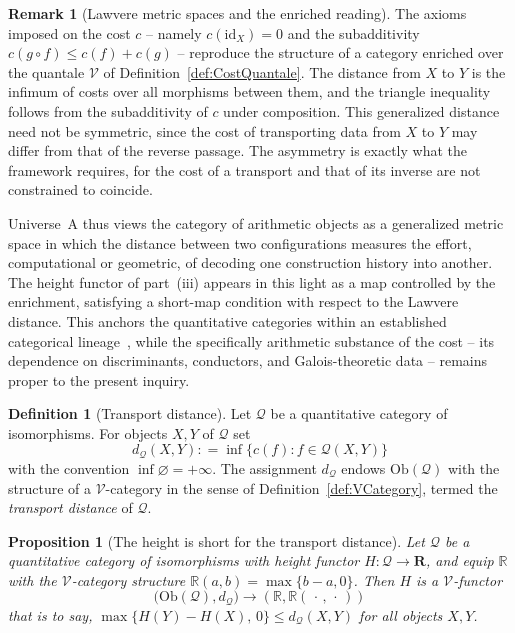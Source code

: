 \documentclass[10pt, reqno]{amsart}
\theoremstyle{plain}
\newtheorem{proposition}[theorem]{Proposition}
\theoremstyle{definition}
\newtheorem{definition}[theorem]{Definition}
\newtheorem{remark}[theorem]{Remark}
\theoremstyle{plain}
\newcommand{\R}{\mathbb{R}}
\newcommand{\coloneqq}{\mathrel{\mathop:}=}
\begin{document}
\begin{remark}[Lawvere metric spaces and the enriched reading]\label{rem:LawvereMetric}
The axioms imposed on the cost $c$ -- namely $c(\mathrm{id}_X) = 0$ and the subadditivity $c(g \circ f) \le c(f) + c(g)$ -- reproduce the structure of a category enriched over the quantale $\mathcal{V}$ of Definition~\ref{def:CostQuantale}. The distance from $X$ to $Y$ is the infimum of costs over all morphisms between them, and the triangle inequality follows from the subadditivity of $c$ under composition. This generalized distance need not be symmetric, since the cost of transporting data from $X$ to $Y$ may differ from that of the reverse passage. The asymmetry is exactly what the framework requires, for the cost of a transport and that of its inverse are not constrained to coincide.

Universe~A thus views the category of arithmetic objects as a generalized metric space in which the distance between two configurations measures the effort, computational or geometric, of decoding one construction history into another. The height functor of part~(iii) appears in this light as a map controlled by the enrichment, satisfying a short-map condition with respect to the Lawvere distance. This anchors the quantitative categories within an established categorical lineage~\cite{Lawvere1973, Kelly1982}, while the specifically arithmetic substance of the cost -- its dependence on discriminants, conductors, and Galois-theoretic data -- remains proper to the present inquiry.
\end{remark}

\begin{definition}[Transport distance]\label{def:TransportDistance}
Let $\mathcal{Q}$ be a quantitative category of isomorphisms. For objects $X,Y$ of $\mathcal{Q}$ set
\[
  d_{\mathcal{Q}}(X,Y) \coloneqq \inf\bigl\{ c(f) : f \in \mathcal{Q}(X,Y) \bigr\}
\]
with the convention $\inf\varnothing = +\infty$. The assignment $d_{\mathcal{Q}}$ endows $\mathrm{Ob}(\mathcal{Q})$ with the structure of a $\mathcal{V}$-category in the sense of Definition~\ref{def:VCategory}, termed the \emph{transport distance} of $\mathcal{Q}$.
\end{definition}

\begin{proposition}[The height is short for the transport distance]
\label{prop:HeightShort}
Let $\mathcal{Q}$ be a quantitative category of isomorphisms with height functor $H \colon \mathcal{Q} \to \mathbf{R}$, and equip $\R$ with the $\mathcal{V}$-category structure $\R(a,b) = \max\{b - a, 0\}$. Then $H$ is a $\mathcal{V}$-functor
\[
  \bigl(\mathrm{Ob}(\mathcal{Q}), d_{\mathcal{Q}}\bigr)
  \longrightarrow
  (\R, \R(\,\cdot\,,\,\cdot\,))
\]
that is to say, $\max\{H(Y) - H(X),\, 0\} \le d_{\mathcal{Q}}(X,Y)$ for all objects $X,Y$.
\end{proposition}
\end{document}
